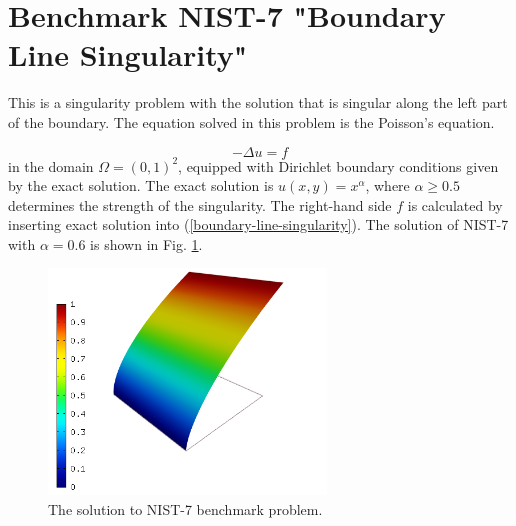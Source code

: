 \documentclass[12pt]{elsarticle}
\begin{document}

\section{Benchmark NIST-7 "Boundary Line Singularity"}
\label{sec:bench-7}

This is a singularity problem with the solution that is singular along the left part of the boundary.
The equation solved in this problem is the Poisson's equation.

\begin{equation} \label{boundary-line-singularity}
-\Delta u = f
\end{equation}
in the domain $\Omega = (0, 1)^2$, equipped with Dirichlet boundary conditions
given by the exact solution. The exact solution is
$u(x,y) = x^{\alpha}$,
where $\alpha \geq 0.5$ determines the strength of the singularity.
The right-hand side $f$ is calculated by inserting exact solution into (\ref{boundary-line-singularity}).
The solution of NIST-7 with $\alpha = 0.6$ is shown in Fig. \ref{fig:sln-nist07}.

\begin{figure}[!ht]
\centering
\includegraphics[height=6cm]{nist/nist-7/solution.png}
\caption{The solution to NIST-7 benchmark problem.}
\label{fig:sln-nist07}
\end{figure}
\end{document}
